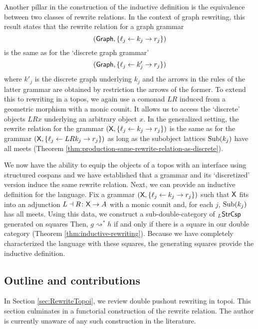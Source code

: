\documentclass{amsart}
\begin{document}
Another pillar in the construction of the inductive
definition is the equivalence between two classes of rewrite
relations.  In the context of graph rewriting, this result
states that the rewrite relation for a graph grammar
$$(\mathsf{Graph} , \{ \ell_j \leftarrow k_j \to r_j\})$$ is the same as for the `discrete graph
grammar'
$$( \mathsf{Graph} , \{ \ell_j \leftarrow k'_j \to r_j\})$$ where $ k'_j $ is the discrete graph
underlying $ k_j $ and the arrows in the rules of the latter
grammar are obtained by restriction the arrows of
the former.  To extend this to rewriting in a topos, we
again use a comonad $ LR $ induced from a geometric morphism
with a monic counit. It allows us to access the `discrete'
objects $ LRx $ underlying an arbitrary object $ x $.  In
the generalized setting, the rewrite relation for the
grammar $ ( \mathsf{X}, \{ \ell_j \leftarrow k_j \to r_j\}) $ is the same
as for the grammar
$ (\mathsf{X} , \{ \ell_j \leftarrow LR k_j \to r_j\}) $ as long as the
subobject lattices $ \operatorname{Sub} (k_j) $ have all meets (Theorem
\ref{thm:production-same-rewrite-relation-as-discrete}).

We now have the ability to equip the objects of a
topos with an interface using structured cospans
and we have established that a grammar and its
`discretized' version induce the same rewrite relation.
Next, we can provide an inductive definition for
the language. Fix a grammar
$ (\mathsf{X}, \{ \ell_j \leftarrow k_j \to r_j\}) $
such that $ \mathsf{X} $ fits into an adjunction
$ L \dashv R \colon \mathsf{X} \to A $ with a monic counit
and, for each $ j $, $ \operatorname{Sub} (k_j) $ has all meets.
Using this data, we construct a
sub-double-category of $ _L\mathsf{StrCsp} $ generated on
squares 
Then, $ g \rightsquigarrow^\ast h$ if and only
if there is a square
 in our double
category (Theorem \ref{thm:inductive-rewriting}).
Because we have completely characterized the
language with these squares, the generating
squares provide the inductive definition. 

\subsection{Outline and contributions}
\label{sec:outl-contr}

In Section \ref{sec:RewriteTopoi}, we review
double pushout rewriting in topoi. This section
culminates in a functorial construction of the
rewrite relation.  The author is currently unaware
of any such construction in the literature.
\end{document}
